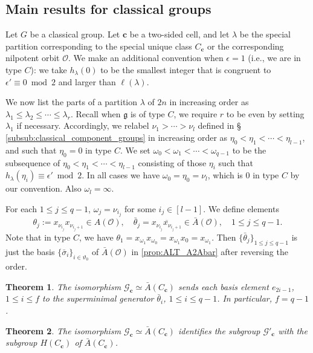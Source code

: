 \documentclass{amsart}
\newtheorem{theorem}{Theorem}[section]
\theoremstyle{definition}
\newcommand{\cG}{\mathcal{G}}
\newcommand{\bc}{{\mathbf{c}}}
\newcommand{\g}{\mathfrak{g}}
\newcommand{\Ab}{\bar{A}}
\newcommand{\0}{\mathcal{O}}
\begin{document}
\subsection{Main results for classical groups}

Let $G$ be a classical group. Let $\bc$ be a two-sided cell, and let $\lambda$ be the special partition corresponding to the special unique class $C_\bc$ or the corresponding nilpotent orbit $\0$. We make an additional convention when $\epsilon = 1$ (i.e., we are in type $C$): we take $h_\lambda(0)$ to be the smallest integer that is congruent to $\epsilon' \equiv 0 \bmod 2$ and larger than $\ell(\lambda)$.

We now list the parts of a partition $\lambda$ of $2n$ in increasing order as $\lambda_1 \le \lambda_2 \le \cdots \le \lambda_r$. Recall when $\g$ is of type $C$, we require $r$ to be even by setting $\lambda_1$ if necessary. Accordingly, we relabel $\nu_1>\cdots > \nu_l$ defined in \S\,\ref{subsub:classical_component_groups} in increasing order as $\eta_0 <\eta_1 < \cdots < \eta_{l-1}$, and such that $\eta_0 = 0$ in type $C$. 
We set $\omega_0 < \omega_1 < \cdots < \omega_{q-1}$ to be the subsequence of $\eta_0 <\eta_1 < \cdots < \eta_{l-1}$ consisting of those $\eta_i$ such that $h_\lambda(\eta_i) \equiv \epsilon' \bmod 2$. In all cases we have $\omega_0 = \eta_0 = \nu_l$, which is $0$ in type $C$ by our convention. Also $\omega_l = \infty$.

For each $1 \le j \le q-1$, $\omega_j = \nu_{i_j}$ for some $i_j \in [l-1]$. We define elements   
	\[\theta_j := x_{\nu_{i_j}} x_{\nu_{i_j+1}} \in A(\0), \quad \bar{\theta}_j = \overline{x_{\nu_{i_j}} x_{\nu_{i_j+1}}} \in \Ab(\0), \quad 1 \le j \le q-1.\] 
Note that in type $C$, we have $\theta_1 =  x_{\omega_1} x_{\omega_0} = x_{\omega_1} x_{0} = x_{\omega_1}$. Then $\{\bar{\theta}_j\}_{1 \le j \le q-1}$ is just the basis $\{ \bar{\sigma}_i \}_{i \in \vartheta_0}$ of $\Ab(\0)$ in \cref{prop:ALT_A2Abar} after reversing the order.



\begin{theorem}\label{thm:superminimal}
	The isomorphism $\cG_\bc \simeq \Ab(C_\bc)$ sends each basis element $e_{2i-1}$, $1 \le i \le f$ to the superminimal generator $\bar{\theta}_i$, $1 \le i \le q-1$. In particular, $f = q-1$.
\end{theorem}

\begin{theorem}\label{thm:G'2H_classical}
	The isomorphism $\cG_\bc \simeq \Ab(C_\bc)$ identifies the subgroup $\cG'_\bc$ with the subgroup $H(C_\bc)$ of $\Ab(C_\bc)$.
\end{theorem}
\end{document}
